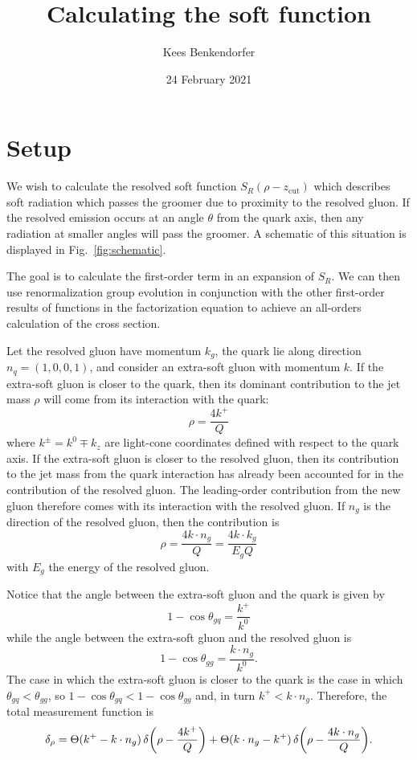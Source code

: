 \documentclass[11pt,twoside,reqno]{amsart}
\title{Calculating the soft function}
\author{Kees Benkendorfer}
\date{24 February 2021}
\theoremstyle{plain}
\theoremstyle{remark}
\theoremstyle{definition}
\theoremstyle{remark}
\theoremstyle{definition}
\theoremstyle{definition}
\newcommand{\zcut}{z_\mathrm{cut}}
\begin{document}
\maketitle

\tableofcontents

\section{Setup}
	We wish to calculate the resolved soft function $S_R(\rho - \zcut)$ which describes soft radiation which passes the groomer due to proximity to the resolved gluon. If the resolved emission occurs at an angle $\theta$ from the quark axis, then any radiation at smaller angles will pass the groomer. A schematic of this situation is displayed in Fig.~\ref{fig:schematic}.

	The goal is to calculate the first-order term in an expansion of $S_R$. We can then use renormalization group evolution in conjunction with the other first-order results of functions in the factorization equation to achieve an all-orders calculation of the cross section.

	Let the resolved gluon have momentum $k_g$, the quark lie along direction $n_q = (1, 0, 0, 1)$, and consider an extra-soft gluon with momentum $k$. If the extra-soft gluon is closer to the quark, then its dominant contribution to the jet mass $\rho$ will come from its interaction with the quark:
	\begin{equation}
		\rho = \frac{4 k^+}{Q}
	\end{equation}
	where $k^{\pm} = k^0 \mp k_z$ are light-cone coordinates defined with respect to the quark axis. If the extra-soft gluon is closer to the resolved gluon, then its contribution to the jet mass from the quark interaction has already been accounted for in the contribution of the resolved gluon. The leading-order contribution from the new gluon therefore comes with its interaction with the resolved gluon. If $n_g$ is the direction of the resolved gluon, then the contribution is
	\begin{equation}
		\rho = \frac{4 k \cdot n_g}{Q} = \frac{4 k \cdot k_g}{E_g Q}
	\end{equation}
	with $E_g$ the energy of the resolved gluon.

	Notice that the angle between the extra-soft gluon and the quark is given by
	\begin{equation}
		1 - \cos\theta_{gq} = \frac{k^+}{k^0}
	\end{equation}
	while the angle between the extra-soft gluon and the resolved gluon is
	\begin{equation}
		1 - \cos\theta_{gg} = \frac{k \cdot n_g}{k^0}.
	\end{equation}
	The case in which the extra-soft gluon is closer to the quark is the case in which $\theta_{gq} < \theta_{gg}$, so $1 - \cos\theta_{gq} < 1 - \cos\theta_{gg}$ and, in turn $k^+ < k \cdot n_g$. Therefore, the total measurement function is
	\begin{equation}
		\delta_\rho = \Theta(k^+ - k\cdot n_g)\,\delta\qty(\rho - \frac{4k^+}{Q}) + \Theta(k\cdot n_g - k^+)\,\delta\qty(\rho - \frac{4k\cdot n_g}{Q}).
	\end{equation}
\end{document}
